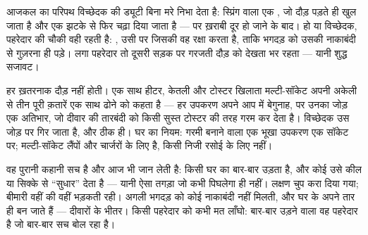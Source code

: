 \begin{example}[विच्छेदक और फ़्यूज़: दो पहरेदार, एक ड्यूटी]\label{ex:g7:short-circuits-safety:breaker}
आजकल का परिपथ विच्छेदक  की ड्यूटी बिना मरे निभा देता है:
स्प्रिंग वाला एक , जो दौड़ पड़ते ही खुल जाता है और एक झटके से फिर
चढ़ा दिया जाता है --- पर ख़राबी दूर हो जाने के बाद।  हो या
विच्छेदक, पहरेदार की चौकी वही रहती है: \emph{}, उसी  पर
जिसकी वह रक्षा करता है, ताकि भगदड़ को उसकी नाकाबंदी से गुज़रना ही पड़े।
 लगा पहरेदार तो दूसरी सड़क पर गरजती दौड़ को देखता भर रहता ---
यानी शुद्ध सजावट।
\end{example}

\begin{example}[अतिभार: शालीन भगदड़]\label{ex:g7:short-circuits-safety:overload}
हर ख़तरनाक दौड़  नहीं होती। एक साथ हीटर, केतली और टोस्टर खिलाता
मल्टी-सॉकेट अपनी अकेली  से तीन पूरी क़तारें एक साथ ढोने को कहता है
--- हर उपकरण अपने आप में बेगुनाह, पर उनका जोड़ एक अतिभार, जो दीवार की
तारबंदी को किसी सुस्त टोस्टर की तरह गरम कर देता है। विच्छेदक उस जोड़ पर
गिर जाता है, और ठीक ही। घर का नियम: गरमी बनाने वाला एक भूखा उपकरण एक
सॉकेट पर; मल्टी-सॉकेट लैंपों और चार्जरों के लिए है, किसी निजी रसोई के
लिए नहीं।
\end{example}

\begin{remark}[वह मरम्मत जो मना है]\label{rem:g7:short-circuits-safety:nail}
वह पुरानी कहानी सच है और आज भी जान लेती है: किसी घर का  बार-बार
उड़ता है, और कोई उसे कील या सिक्के से ``सुधार'' देता है --- यानी ऐसा
तगड़ा  जो कभी पिघलेगा ही नहीं। लक्षण चुप करा दिया गया; बीमारी वहीं
की वहीं भड़कती रही। अगली भगदड़ को कोई नाकाबंदी नहीं मिलती, और घर के
अपने तार ही  बन जाते हैं --- दीवारों के भीतर। किसी पहरेदार को
कभी मत लाँघो: बार-बार उड़ने वाला  वह पहरेदार है जो बार-बार सच
बोल रहा है।
\end{remark}

